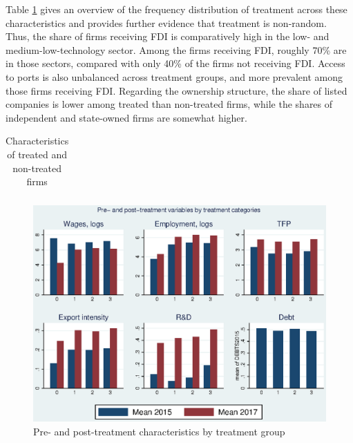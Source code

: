 Table \ref{treatment_char} gives an overview of the frequency distribution of treatment across these characteristics and provides further evidence that treatment is non-random. Thus, the share of firms receiving FDI is comparatively high in the low- and medium-low-technology sector. Among the firms receiving FDI, roughly 70\% are in those sectors, compared with only 40\% of the firms not receiving FDI. Access to ports is also unbalanced across treatment groups, and more prevalent among those firms receiving FDI. Regarding the ownership structure, the share of listed companies is lower among treated than non-treated firms, while the shares of independent and state-owned firms are somewhat higher.  \\ \par


\begin{centering}
\begin{table}[htbp]\centering \caption{Characteristics of treated and non-treated firms\label{treatment_char}}
\begin{tabular}[htbp!]{lrrrrrrrrrr}
\hline\hline

\hline\hline
\end{tabular} 
 \end{table}
 \end{centering}
 
 
\begin{figure}[htbp!]\caption{Pre- and post-treatment characteristics by treatment group}\label{fig_treatment_type}
\begin{center}
\includegraphics[scale=1]{figures_and_tables/bar_pre_post} 
\end{center}
\end{figure}


